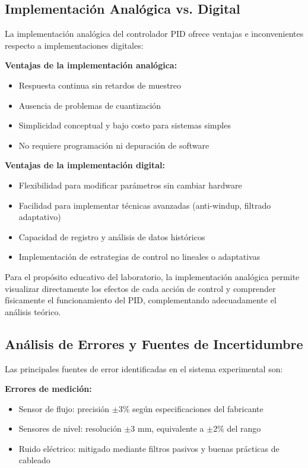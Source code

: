\documentclass[conference]{IEEEtran}
\begin{document}
\subsection{Implementación Analógica vs. Digital}

La implementación analógica del controlador PID ofrece ventajas e inconvenientes respecto a implementaciones digitales:

\textbf{Ventajas de la implementación analógica:}
\begin{itemize}
\item Respuesta continua sin retardos de muestreo
\item Ausencia de problemas de cuantización
\item Simplicidad conceptual y bajo costo para sistemas simples
\item No requiere programación ni depuración de software
\end{itemize}

\textbf{Ventajas de la implementación digital:}
\begin{itemize}
\item Flexibilidad para modificar parámetros sin cambiar hardware
\item Facilidad para implementar técnicas avanzadas (anti-windup, filtrado adaptativo)
\item Capacidad de registro y análisis de datos históricos
\item Implementación de estrategias de control no lineales o adaptativas
\end{itemize}

Para el propósito educativo del laboratorio, la implementación analógica permite visualizar directamente los efectos de cada acción de control y comprender físicamente el funcionamiento del PID, complementando adecuadamente el análisis teórico.

\subsection{Análisis de Errores y Fuentes de Incertidumbre}

Las principales fuentes de error identificadas en el sistema experimental son:

\textbf{Errores de medición:}
\begin{itemize}
\item Sensor de flujo: precisión $\pm$3\% según especificaciones del fabricante
\item Sensores de nivel: resolución $\pm$3 mm, equivalente a $\pm$2\% del rango
\item Ruido eléctrico: mitigado mediante filtros pasivos y buenas prácticas de cableado
\end{itemize}
\end{document}
